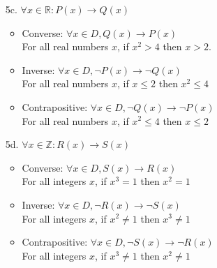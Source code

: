 {\begin{enumerate}
\begin{itemize}
                \item Contrapositive:
                        $\forall x \in D, \neg M(x) \to \neg (P(x) \lor G(x))$      \\
                        For all people $x$, if $x$ is NOT a musician,
                        then $x$ doesn't play piano and $x$ doesn't play guitar.
                     
            \end{itemize}
    \item[5c.] $\forall x \in \mathbb{R}: P(x) \to Q(x)$
            \begin{itemize}
                \item Converse:
                        $\forall x \in D, Q(x) \to P(x)$      \\
                        For all real numbers $x$, if $x^{2} > 4$ then $x > 2$.     
                
                \item Inverse:
                        $\forall x \in D, \neg P(x) \to \neg Q(x)$      \\
                        For all real numbers $x$, if $x \leq 2$ then $x^{2} \leq 4$     
                
                \item Contrapositive:
                        $\forall x \in D, \neg Q(x) \to \neg P(x)$      \\
                        For all real numbers $x$, if $x^{2} \leq 4$ then $x \leq 2$     
            \end{itemize}
    \item[5d.] $\forall x \in \mathbb{Z}: R(x) \to S(x)$
            \begin{itemize}
                \item Converse:
                        $\forall x \in D, S(x) \to R(x)$      \\
                        For all integers $x$, if $x^{3} = 1$ then $x^{2} = 1$     
                
                \item Inverse:
                        $\forall x \in D, \neg R(x) \to \neg S(x)$      \\
                        For all integers $x$, if $x^{2} \neq 1$ then $x^{3} \neq 1$     
                
                \item Contrapositive:
                        $\forall x \in D, \neg S(x) \to \neg R(x)$      \\
                        For all integers $x$, if $x^{3} \neq 1$ then $x^{2} \neq 1$     
            \end{itemize}
\end{enumerate}

}



